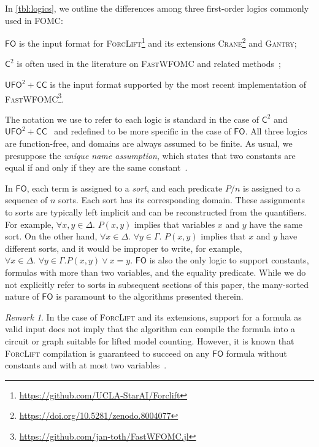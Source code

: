 \documentclass[letterpaper]{article} %
\theoremstyle{remark}
\newtheorem*{remark}{Remark}
\theoremstyle{definition}
\newcommand{\Ctwo}{$\mathsf{C}^{2}$}
\newcommand{\FO}{$\mathsf{FO}$}
\newcommand{\UFO}{$\mathsf{UFO}^{2} + \mathsf{CC}$}
\newcommand{\Cranetwo}{\textsc{Gantry}}
\begin{document}
In \cref{tbl:logics}, we outline the differences among three first-order logics
commonly used in FOMC:
\begin{enumerate*}[label=(\roman*)]
  \item \FO{} is the input format for
  \textsc{ForcLift}\footnote{\url{https://github.com/UCLA-StarAI/Forclift}} and
  its extensions
  \textsc{Crane}\footnote{\url{https://doi.org/10.5281/zenodo.8004077}} and
  \Cranetwo{};
  \item \Ctwo{} is often used in the literature on \textsc{FastWFOMC} and
  related
  methods~\cite{DBLP:journals/jair/Kuzelka21,DBLP:conf/aaai/MalhotraS22};
  \item \UFO{} is the input format supported by the most recent implementation
  of
  \textsc{FastWFOMC}\footnote{\url{https://github.com/jan-toth/FastWFOMC.jl}}.
\end{enumerate*}
The notation we use to refer to each logic is standard in the case of \Ctwo{}
and \UFO{}~\cite{tóth2024complexityweightedfirstordermodel} and redefined to be
more specific in the case of \FO{}. All three logics are function-free, and
domains are always assumed to be finite. As usual, we presuppose the
\emph{unique name assumption}, which states that two constants are equal if and
only if they are the same constant~\cite{DBLP:books/aw/RN2020}.

\renewcommand*{\thefootnote}{\arabic{footnote}}

In \FO{}, each term is assigned to a \emph{sort}, and each predicate $P/n$ is
assigned to a sequence of $n$ sorts. Each sort has its corresponding domain.
These assignments to sorts are typically left implicit and can be reconstructed
from the quantifiers. For example, $\forall x,y \in \Delta\text{. }P(x, y)$
implies that variables $x$ and $y$ have the same sort. On the other hand,
$\forall x \in \Delta\text{. }\forall y \in \Gamma\text{. } P(x, y)$ implies
that $x$ and $y$ have different sorts, and it would be improper to write, for
example, $\forall x \in \Delta\text{. }\forall y \in \Gamma\text{.
} P(x, y) \lor x = y$. \FO{} is also the only logic to support constants,
formulas with more than two variables, and the equality predicate. While we do
not explicitly refer to sorts in subsequent sections of this paper, the
many-sorted nature of \FO{} is paramount to the algorithms presented therein.

\begin{remark}
  In the case of \textsc{ForcLift} and its extensions, support for a formula as
  valid input does not imply that the algorithm can compile the formula into a
  circuit or graph suitable for lifted model counting. However, it is known that
  \textsc{ForcLift} compilation is guaranteed to succeed on any \FO{} formula
  without constants and with at most two
  variables~\cite{DBLP:conf/nips/Broeck11,DBLP:conf/kr/BroeckMD14}.
\end{remark}
\end{document}
